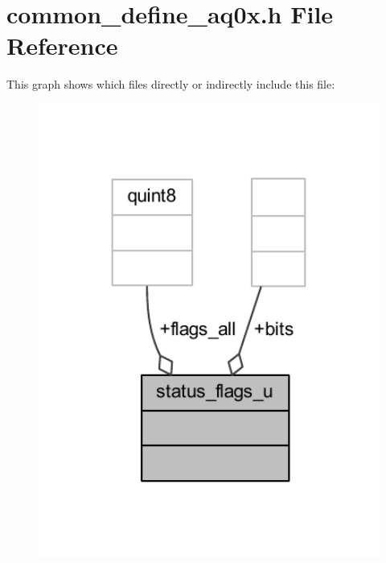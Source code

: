 \hypertarget{a00086}{\section{common\+\_\+define\+\_\+aq0x.\+h File Reference}
\label{a00086}
}
This graph shows which files directly or indirectly include this file\+:
\nopagebreak
\begin{figure}[H]
\begin{center}
\leavevmode
\includegraphics[width=350pt]{d2/dc8/a00242}
\end{center}
\end{figure}

